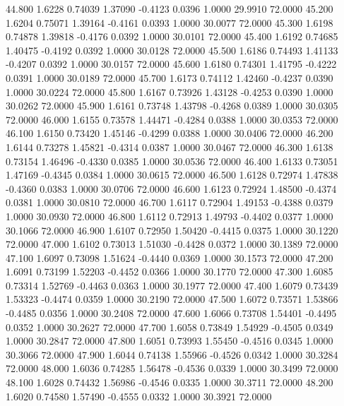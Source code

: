   44.800   1.6228   0.74039   1.37090  -0.4123   0.0396   1.0000  29.9910  72.0000
  45.200   1.6204   0.75071   1.39164  -0.4161   0.0393   1.0000  30.0077  72.0000
  45.300   1.6198   0.74878   1.39818  -0.4176   0.0392   1.0000  30.0101  72.0000
  45.400   1.6192   0.74685   1.40475  -0.4192   0.0392   1.0000  30.0128  72.0000
  45.500   1.6186   0.74493   1.41133  -0.4207   0.0392   1.0000  30.0157  72.0000
  45.600   1.6180   0.74301   1.41795  -0.4222   0.0391   1.0000  30.0189  72.0000
  45.700   1.6173   0.74112   1.42460  -0.4237   0.0390   1.0000  30.0224  72.0000
  45.800   1.6167   0.73926   1.43128  -0.4253   0.0390   1.0000  30.0262  72.0000
  45.900   1.6161   0.73748   1.43798  -0.4268   0.0389   1.0000  30.0305  72.0000
  46.000   1.6155   0.73578   1.44471  -0.4284   0.0388   1.0000  30.0353  72.0000
  46.100   1.6150   0.73420   1.45146  -0.4299   0.0388   1.0000  30.0406  72.0000
  46.200   1.6144   0.73278   1.45821  -0.4314   0.0387   1.0000  30.0467  72.0000
  46.300   1.6138   0.73154   1.46496  -0.4330   0.0385   1.0000  30.0536  72.0000
  46.400   1.6133   0.73051   1.47169  -0.4345   0.0384   1.0000  30.0615  72.0000
  46.500   1.6128   0.72974   1.47838  -0.4360   0.0383   1.0000  30.0706  72.0000
  46.600   1.6123   0.72924   1.48500  -0.4374   0.0381   1.0000  30.0810  72.0000
  46.700   1.6117   0.72904   1.49153  -0.4388   0.0379   1.0000  30.0930  72.0000
  46.800   1.6112   0.72913   1.49793  -0.4402   0.0377   1.0000  30.1066  72.0000
  46.900   1.6107   0.72950   1.50420  -0.4415   0.0375   1.0000  30.1220  72.0000
  47.000   1.6102   0.73013   1.51030  -0.4428   0.0372   1.0000  30.1389  72.0000
  47.100   1.6097   0.73098   1.51624  -0.4440   0.0369   1.0000  30.1573  72.0000
  47.200   1.6091   0.73199   1.52203  -0.4452   0.0366   1.0000  30.1770  72.0000
  47.300   1.6085   0.73314   1.52769  -0.4463   0.0363   1.0000  30.1977  72.0000
  47.400   1.6079   0.73439   1.53323  -0.4474   0.0359   1.0000  30.2190  72.0000
  47.500   1.6072   0.73571   1.53866  -0.4485   0.0356   1.0000  30.2408  72.0000
  47.600   1.6066   0.73708   1.54401  -0.4495   0.0352   1.0000  30.2627  72.0000
  47.700   1.6058   0.73849   1.54929  -0.4505   0.0349   1.0000  30.2847  72.0000
  47.800   1.6051   0.73993   1.55450  -0.4516   0.0345   1.0000  30.3066  72.0000
  47.900   1.6044   0.74138   1.55966  -0.4526   0.0342   1.0000  30.3284  72.0000
  48.000   1.6036   0.74285   1.56478  -0.4536   0.0339   1.0000  30.3499  72.0000
  48.100   1.6028   0.74432   1.56986  -0.4546   0.0335   1.0000  30.3711  72.0000
  48.200   1.6020   0.74580   1.57490  -0.4555   0.0332   1.0000  30.3921  72.0000
